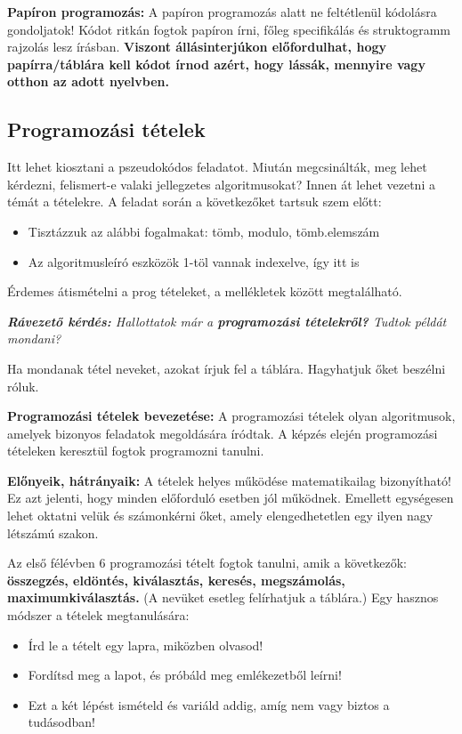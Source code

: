 \documentclass[../Main.tex]{subfiles}
\begin{document}
\textbf{Papíron programozás:}
A papíron programozás alatt ne feltétlenül kódolásra gondoljatok!
Kódot ritkán fogtok papíron írni, főleg specifikálás és struktogramm rajzolás lesz írásban.
\textbf{Viszont állásinterjúkon előfordulhat, hogy papírra/táblára kell kódot írnod azért, hogy lássák, mennyire vagy otthon az adott nyelvben.}

\subsection{Programozási tételek}

Itt lehet kiosztani a pszeudokódos feladatot.
Miután megcsinálták, meg lehet kérdezni, felismert-e valaki jellegzetes algoritmusokat? Innen át lehet vezetni a témát a tételekre.
A feladat során a következőket tartsuk szem előtt:
\begin{itemize}
    \item Tisztázzuk az alábbi fogalmakat: tömb, modulo, tömb.elemszám
    \item Az algoritmusleíró eszközök 1-töl vannak indexelve, így itt is
\end{itemize}

Érdemes átismételni a prog tételeket, a mellékletek között megtalálható.

\textit{\textbf{Rávezető kérdés:}
Hallottatok már a \textbf{programozási tételekről?}
Tudtok példát mondani?
}

Ha mondanak tétel neveket, azokat írjuk fel a táblára.
Hagyhatjuk őket beszélni róluk.

\textbf{Programozási tételek bevezetése:}
A programozási tételek olyan algoritmusok, amelyek bizonyos feladatok megoldására íródtak.
A képzés elején programozási tételeken keresztül fogtok programozni tanulni.

\textbf{Előnyeik, hátrányaik:}
A tételek helyes működése matematikailag bizonyítható!
Ez azt jelenti, hogy minden előforduló esetben jól működnek.
Emellett egységesen lehet oktatni velük és számonkérni őket, amely elengedhetetlen egy ilyen nagy létszámú szakon.

Az első félévben 6 programozási tételt fogtok tanulni, amik a következők:
\textbf{összegzés, eldöntés, kiválasztás, keresés, megszámolás, maximumkiválasztás.}
(A nevüket esetleg felírhatjuk a táblára.)
Egy hasznos módszer a tételek megtanulására:
\begin{itemize}
    \item Írd le a tételt egy lapra, miközben olvasod!
    \item Fordítsd meg a lapot, és próbáld meg emlékezetből leírni!
    \item Ezt a két lépést ismételd és variáld addig, amíg nem vagy biztos a tudásodban!
\end{itemize}
\end{document}

